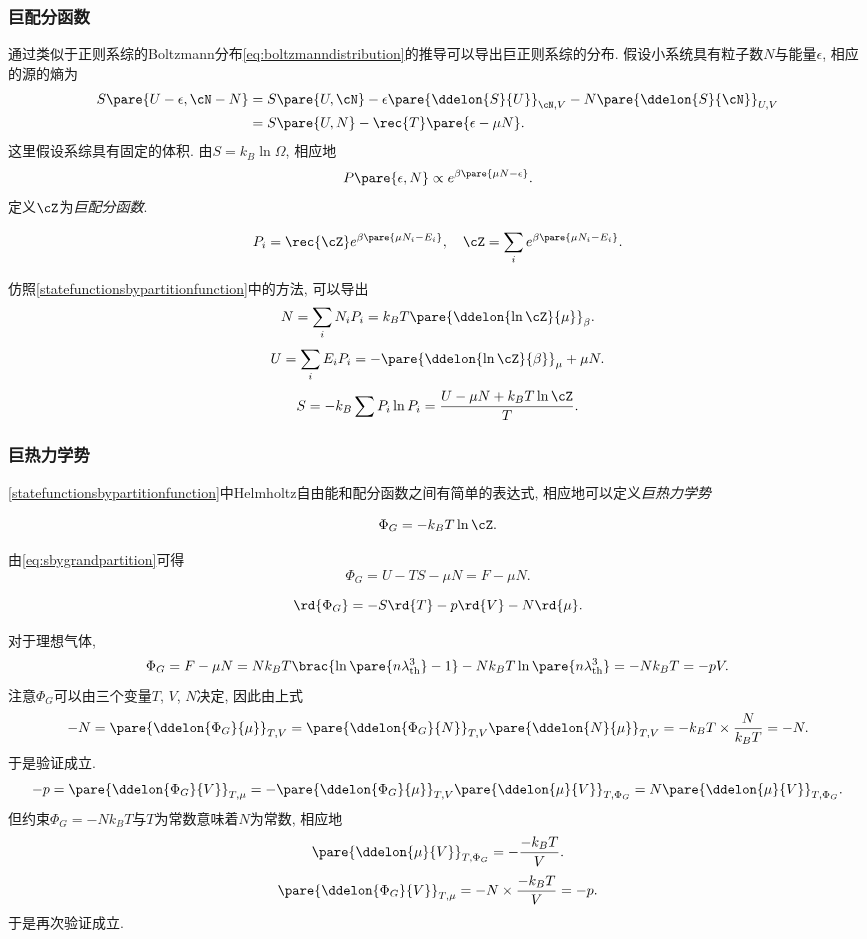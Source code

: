 \documentclass[../Thermal.tex]{subfiles}
\begin{document}
\subsubsection{巨配分函数}
通过类似于正则系综的Boltzmann分布\eqref{eq:boltzmanndistribution}的推导可以导出巨正则系综的分布. 假设小系统具有粒子数$N$与能量$\epsilon$, 相应的源的熵为
\begin{align*}
S\pare{U-\epsilon, \cN - N} &= S\pare{U,\cN} - \epsilon\pare{\ddelon{S}{U}}_{\cN, V} - N\pare{\ddelon{S}{\cN}}_{U,V}\\
&= S\pare{U,N} - \rec{T}\pare{\epsilon - \mu N}.
\end{align*}
这里假设系综具有固定的体积. 由$S=k_B\ln\Omega$, 相应地
\[ P\pare{\epsilon,N} \propto e^{\beta\pare{\mu N - \epsilon}}. \]
定义$\cZ$为\emph{巨配分函数}.
\begin{finale}
\[ P_i = \rec{\cZ} e^{\beta\pare{\mu N_i - E_i}},\quad \cZ = \sum_i e^{\beta\pare{\mu N_i - E_i}}. \]
\end{finale}
仿照\ref{statefunctionsbypartitionfunction}中的方法, 可以导出
\[ N = \sum_i N_i P_i = k_BT\pare{\ddelon{\ln \cZ}{\mu}}_{\beta}. \]
\[ U = \sum_i E_i P_i = -\pare{\ddelon{\ln \cZ}{\beta}}_\mu + \mu N. \]
\begin{equation}
\label{eq:sbygrandpartition}
S = -k_B \sum P_i \ln P_i = \frac{U - \mu N + k_B T\ln \cZ}{T}.
\end{equation}
\subsubsection{巨热力学势}
\ref{statefunctionsbypartitionfunction}中Helmholtz自由能和配分函数之间有简单的表达式, 相应地可以定义\emph{巨热力学势}
\begin{finale}
\[ \Phi_G = -k_B T\ln \cZ. \]
\end{finale}
由\eqref{eq:sbygrandpartition}可得
\[ \Phi_G = U - TS -\mu N = F - \mu N. \]
\begin{finale}
\[ \rd{\Phi_G} = -S\rd{T} - p\rd{V} - N\rd{\mu}. \]
\end{finale}
\begin{ex}
对于理想气体,
\[ \Phi_G = F - \mu N = Nk_BT\brac{\ln\pare{n\lambda_{\mathrm{th}}^3} - 1} - Nk_BT\ln\pare{n\lambda_{\text{th}}^3} = -Nk_BT = -pV. \]
注意$\Phi_G$可以由三个变量$T$, $V$, $N$决定, 因此由上式
\[ -N = \pare{\ddelon{\Phi_G}{\mu}}_{T,V} = \pare{\ddelon{\Phi_G}{N}}_{T,V}\pare{\ddelon{N}{\mu}}_{T,V} = -k_BT\times \frac{N}{k_BT} = -N. \]
于是验证成立.
\[ -p = \pare{\ddelon{\Phi_G}{V}}_{T,\mu} = -\pare{\ddelon{\Phi_G}{\mu}}_{T,V}\pare{\ddelon{\mu}{V}}_{T,\Phi_G} = N\pare{\ddelon{\mu}{V}}_{T,\Phi_G}. \]
但约束$\Phi_G=-Nk_BT$与$T$为常数意味着$N$为常数, 相应地
\[ \pare{\ddelon{\mu}{V}}_{T,\Phi_G} = -\frac{-k_BT}{V}. \]
\[ \pare{\ddelon{\Phi_G}{V}}_{T,\mu} = -N\times \frac{-k_BT}{V} = -p. \]
于是再次验证成立.
\end{ex}
\end{document}

